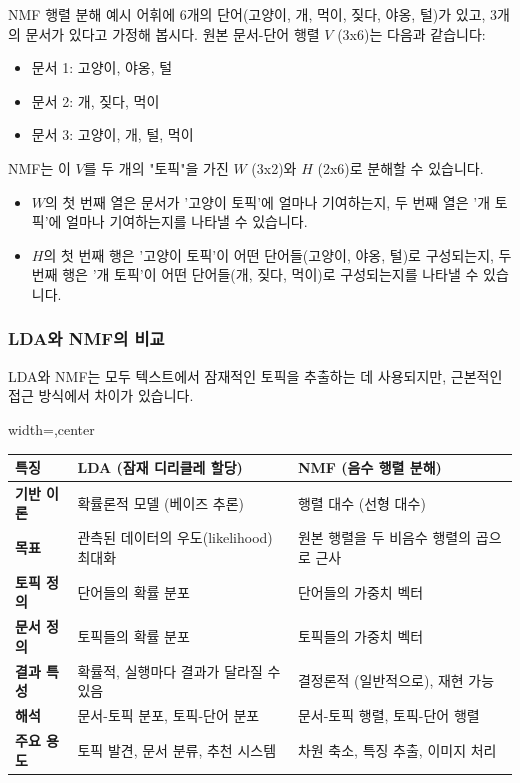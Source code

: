 \documentclass[11pt,a4paper]{article}
\begin{document}
\begin{examplebox}{NMF 행렬 분해 예시}
어휘에 6개의 단어(고양이, 개, 먹이, 짖다, 야옹, 털)가 있고, 3개의 문서가 있다고 가정해 봅시다.
원본 문서-단어 행렬 $V$ (3x6)는 다음과 같습니다:
\begin{itemize}
    \item 문서 1: 고양이, 야옹, 털
    \item 문서 2: 개, 짖다, 먹이
    \item 문서 3: 고양이, 개, 털, 먹이
\end{itemize}
NMF는 이 $V$를 두 개의 "토픽"을 가진 $W$ (3x2)와 $H$ (2x6)로 분해할 수 있습니다.
\begin{itemize}
    \item $W$의 첫 번째 열은 문서가 '고양이 토픽'에 얼마나 기여하는지, 두 번째 열은 '개 토픽'에 얼마나 기여하는지를 나타낼 수 있습니다.
    \item $H$의 첫 번째 행은 '고양이 토픽'이 어떤 단어들(고양이, 야옹, 털)로 구성되는지, 두 번째 행은 '개 토픽'이 어떤 단어들(개, 짖다, 먹이)로 구성되는지를 나타낼 수 있습니다.
\end{itemize}
\end{examplebox}

\subsubsection{LDA와 NMF의 비교}
LDA와 NMF는 모두 텍스트에서 잠재적인 토픽을 추출하는 데 사용되지만, 근본적인 접근 방식에서 차이가 있습니다.

\begin{adjustbox}{width=\textwidth,center}
\begin{tabular}{lll}
\toprule
\textbf{특징} & \textbf{LDA (잠재 디리클레 할당)} & \textbf{NMF (음수 행렬 분해)} \\
\midrule
\textbf{기반 이론} & 확률론적 모델 (베이즈 추론) & 행렬 대수 (선형 대수) \\
\textbf{목표} & 관측된 데이터의 우도(likelihood) 최대화 & 원본 행렬을 두 비음수 행렬의 곱으로 근사 \\
\textbf{토픽 정의} & 단어들의 확률 분포 & 단어들의 가중치 벡터 \\
\textbf{문서 정의} & 토픽들의 확률 분포 & 토픽들의 가중치 벡터 \\
\textbf{결과 특성} & 확률적, 실행마다 결과가 달라질 수 있음 & 결정론적 (일반적으로), 재현 가능 \\
\textbf{해석} & 문서-토픽 분포, 토픽-단어 분포 & 문서-토픽 행렬, 토픽-단어 행렬 \\
\textbf{주요 용도} & 토픽 발견, 문서 분류, 추천 시스템 & 차원 축소, 특징 추출, 이미지 처리 \\
\bottomrule
\end{tabular}
\end{adjustbox}
\end{document}
